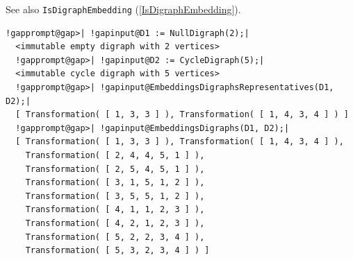 \documentclass[a4paper,11pt]{report}
\begin{document}
{{{ See also \texttt{IsDigraphEmbedding} (\ref{IsDigraphEmbedding}). 
\begin{Verbatim}[commandchars=!@|,fontsize=\small,frame=single,label=Example]
  !gapprompt@gap>| !gapinput@D1 := NullDigraph(2);|
  <immutable empty digraph with 2 vertices>
  !gapprompt@gap>| !gapinput@D2 := CycleDigraph(5);|
  <immutable cycle digraph with 5 vertices>
  !gapprompt@gap>| !gapinput@EmbeddingsDigraphsRepresentatives(D1, D2);|
  [ Transformation( [ 1, 3, 3 ] ), Transformation( [ 1, 4, 3, 4 ] ) ]
  !gapprompt@gap>| !gapinput@EmbeddingsDigraphs(D1, D2);|
  [ Transformation( [ 1, 3, 3 ] ), Transformation( [ 1, 4, 3, 4 ] ),
    Transformation( [ 2, 4, 4, 5, 1 ] ),
    Transformation( [ 2, 5, 4, 5, 1 ] ),
    Transformation( [ 3, 1, 5, 1, 2 ] ),
    Transformation( [ 3, 5, 5, 1, 2 ] ),
    Transformation( [ 4, 1, 1, 2, 3 ] ),
    Transformation( [ 4, 2, 1, 2, 3 ] ),
    Transformation( [ 5, 2, 2, 3, 4 ] ),
    Transformation( [ 5, 3, 2, 3, 4 ] ) ]
\end{Verbatim}
 }

 

}}
\end{document}
